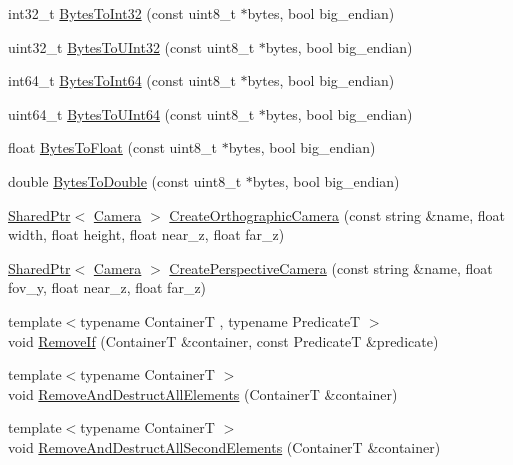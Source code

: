 \begin{DoxyCompactItemize}
\item 
int32\+\_\+t \hyperlink{namespacemage_a274862b36cabc10b90dd7148d42a29a6}{Bytes\+To\+Int32} (const uint8\+\_\+t $\ast$bytes, bool big\+\_\+endian)
\item 
uint32\+\_\+t \hyperlink{namespacemage_a46a019c7f927a6f559b36a8b5c01ab9c}{Bytes\+To\+U\+Int32} (const uint8\+\_\+t $\ast$bytes, bool big\+\_\+endian)
\item 
int64\+\_\+t \hyperlink{namespacemage_a09884643d0e3afe8591f9104785ce480}{Bytes\+To\+Int64} (const uint8\+\_\+t $\ast$bytes, bool big\+\_\+endian)
\item 
uint64\+\_\+t \hyperlink{namespacemage_a93f1f8baabf199005ea96e0a2b6941e3}{Bytes\+To\+U\+Int64} (const uint8\+\_\+t $\ast$bytes, bool big\+\_\+endian)
\item 
float \hyperlink{namespacemage_a5e41913a3a1613add8511e5834e09277}{Bytes\+To\+Float} (const uint8\+\_\+t $\ast$bytes, bool big\+\_\+endian)
\item 
double \hyperlink{namespacemage_af85b8ba1e336f37fc8fe34a53e981a6c}{Bytes\+To\+Double} (const uint8\+\_\+t $\ast$bytes, bool big\+\_\+endian)
\item 
\hyperlink{namespacemage_a1e01ae66713838a7a67d30e44c67703e}{Shared\+Ptr}$<$ \hyperlink{classmage_1_1_camera}{Camera} $>$ \hyperlink{namespacemage_a16a1ce53c6e6780ead2325cf3741a36f}{Create\+Orthographic\+Camera} (const string \&name, float width, float height, float near\+\_\+z, float far\+\_\+z)
\item 
\hyperlink{namespacemage_a1e01ae66713838a7a67d30e44c67703e}{Shared\+Ptr}$<$ \hyperlink{classmage_1_1_camera}{Camera} $>$ \hyperlink{namespacemage_a9d39e62839bab5c922dec04c286dc511}{Create\+Perspective\+Camera} (const string \&name, float fov\+\_\+y, float near\+\_\+z, float far\+\_\+z)
\item 
{\footnotesize template$<$typename ContainerT , typename PredicateT $>$ }\\void \hyperlink{namespacemage_a403ff95eb779de1fbbf139661feb2d1b}{Remove\+If} (ContainerT \&container, const PredicateT \&predicate)
\item 
{\footnotesize template$<$typename ContainerT $>$ }\\void \hyperlink{namespacemage_a56c8c38aee820faf885024ed22e70a8e}{Remove\+And\+Destruct\+All\+Elements} (ContainerT \&container)
\item 
{\footnotesize template$<$typename ContainerT $>$ }\\void \hyperlink{namespacemage_aa3db059e4b0563e46cdf3a3a369c3288}{Remove\+And\+Destruct\+All\+Second\+Elements} (ContainerT \&container)

\end{DoxyCompactItemize}
